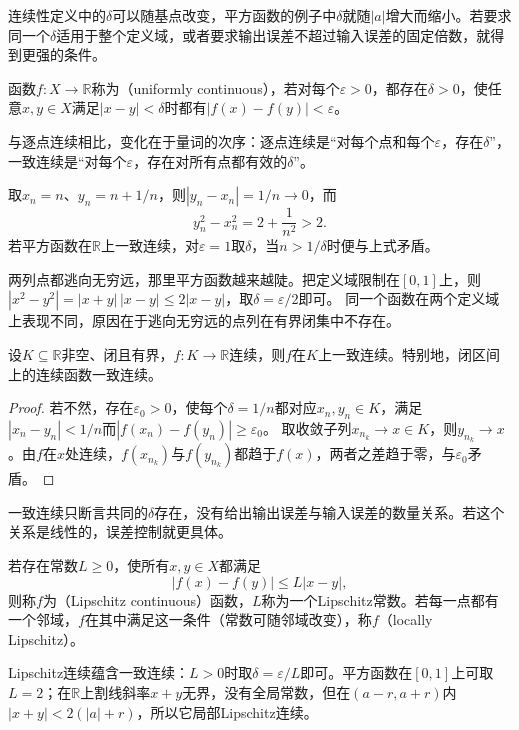 连续性定义中的$\delta$可以随基点改变，平方函数的例子中$\delta$就随$|a|$增大而缩小。若要求同一个$\delta$适用于整个定义域，或者要求输出误差不超过输入误差的固定倍数，就得到更强的条件。
\begin{definition}[一致连续]
\label{def:analysis-uniform-continuity}
函数$f:X\to\mathbb R$称为（uniformly continuous），若对每个$\varepsilon>0$，都存在$\delta>0$，使任意$x,y\in X$满足$|x-y|<\delta$时都有$|f(x)-f(y)|<\varepsilon$。
\end{definition}
与逐点连续相比，变化在于量词的次序：逐点连续是“对每个点和每个$\varepsilon$，存在$\delta$”，一致连续是“对每个$\varepsilon$，存在对所有点都有效的$\delta$”。
\begin{example}[平方函数在实轴上不一致连续]
\label{ex:analysis-square-not-uniformly-continuous}
取$x_n=n$、$y_n=n+1/n$，则$|y_n-x_n|=1/n\to0$，而
\[
 y_n^2-x_n^2=2+\frac1{n^2}>2.
\]若平方函数在$\mathbb R$上一致连续，对$\varepsilon=1$取$\delta$，当$n>1/\delta$时便与上式矛盾。
\end{example}
两列点都逃向无穷远，那里平方函数越来越陡。把定义域限制在$[0,1]$上，则$|x^2-y^2|=|x+y|\,|x-y|\leq2|x-y|$，取$\delta=\varepsilon/2$即可。
同一个函数在两个定义域上表现不同，原因在于逃向无穷远的点列在有界闭集中不存在。
\begin{theorem}[一致连续性定理]
\label{thm:analysis-uniform-continuity}
设$K\subseteq\mathbb R$非空、闭且有界，$f:K\to\mathbb R$连续，则$f$在$K$上一致连续。特别地，闭区间上的连续函数一致连续。
\end{theorem}
\begin{proof}
若不然，存在$\varepsilon_0>0$，使每个$\delta=1/n$都对应$x_n,y_n\in K$，满足$|x_n-y_n|<1/n$而$|f(x_n)-f(y_n)|\geq\varepsilon_0$。
取收敛子列$x_{n_k}\to x\in K$，则$y_{n_k}\to x$。由$f$在$x$处连续，$f(x_{n_k})$与$f(y_{n_k})$都趋于$f(x)$，两者之差趋于零，与$\varepsilon_0$矛盾。
\end{proof}

一致连续只断言共同的$\delta$存在，没有给出输出误差与输入误差的数量关系。若这个关系是线性的，误差控制就更具体。
\begin{definition}[Lipschitz连续]
\label{def:analysis-lipschitz-continuity}
若存在常数$L\geq0$，使所有$x,y\in X$都满足
\begin{equation}
 |f(x)-f(y)|\leq L|x-y|,
 \label{eq:analysis-lipschitz-condition}
\end{equation}
则称$f$为（Lipschitz continuous）函数，$L$称为一个Lipschitz常数。若每一点都有一个邻域，$f$在其中满足这一条件（常数可随邻域改变），称$f$（locally Lipschitz）。
\end{definition}
Lipschitz连续蕴含一致连续：$L>0$时取$\delta=\varepsilon/L$即可。平方函数在$[0,1]$上可取$L=2$；在$\mathbb R$上割线斜率$x+y$无界，没有全局常数，但在$(a-r,a+r)$内$|x+y|<2(|a|+r)$，所以它局部Lipschitz连续。

